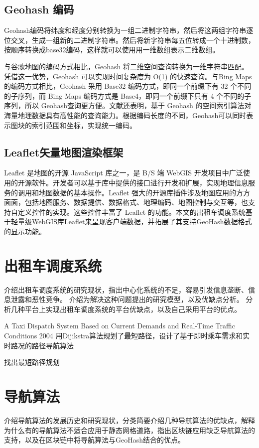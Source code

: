 \subsection{Geohash 编码}
Geohash编码将纬度和经度分别转换为一组二进制字符串，然后将这两组字符串逐位交叉，生成一组新的二进制字符串。然后将新字符串每五位转成一个十进制数，按顺序转换成base32编码，这样就可以使用用一维数组表示二维数组。\par
与谷歌地图的编码方式相比，Geohash 将二维空间查询转换为一维字符串匹配。凭借这一优势，Geohash 可以实现时间复杂度为 O(1)  的快速查询。与Bing Maps的编码方式相比，Geohash 采用 Base32 编码方式，即同一个前缀下有 32 个不同的子序列，而 Bing Maps 编码方式是 Base4，即同一个前缀下只有 4 个不同的子序列，所以 Geohash查询更方便。文献还表明，基于 Geohash 的空间索引算法对海量地理数据具有高性能的查询能力。根据编码长度的不同，Geohash可以同时表示图块的索引范围和坐标，实现统一编码。

\subsection{Leaflet矢量地图渲染框架}
Leaflet 是地图的开源 JavaScript 库之一，是 B/S 端 WebGIS 开发项目中广泛使用的开源软件。开发者可以基于库中提供的接口进行开发和扩展，实现地理信息服务的调用和地图数据的基本操作。Leaflet 强大的开源库插件涉及地图应用的方方面面，包括地图服务、数据提供、数据格式、地理编码、地图控制与交互等，也支持自定义控件的实现。这些控件丰富了 Leaflet  的功能。本文的出租车调度系统基于轻量级WebGIS库Leaflet来呈现客户端数据，并拓展了其支持GeoHash数据格式的显示功能。

\section{出租车调度系统}
介绍出租车调度系统的研究现状，指出中心化系统的不足，容易引发信息垄断、信息泄露和恶性竞争。
介绍为解决这种问题提出的研究模型，以及优缺点分析。
分析几种平台上实现出租车调度系统的平台优缺点，以及自己采用平台的优点。

A Taxi Dispatch System Based on Current Demands and Real-Time Traffic Conditions 2004 用Dijikstra算法规划了最短路径，设计了基于即时乘车需求和实时路况的路径导航算法

找出最短路径规划

\section{导航算法}



介绍导航算法的发展历史和研究现状，分类简要介绍几种导航算法的优缺点，解释为什么有的导航算法不适合应用于静态网格道路，指出区块链应用缺乏导航算法的支持，以及在区块链中将导航算法与GeoHash结合的优点。



